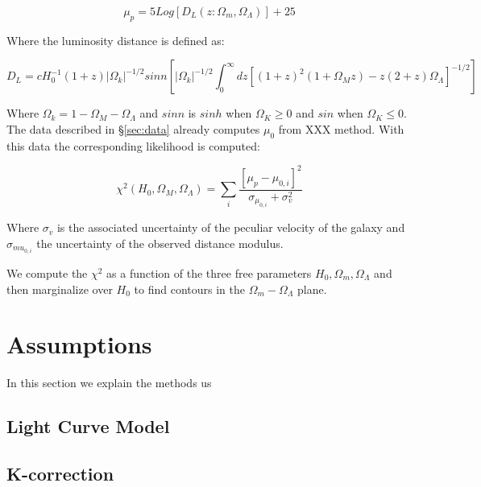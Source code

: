 \documentclass[11pt]{article}
\begin{document}

\begin{equation}\label{eq:dmodulus}
\mu_p =  5Log[D_L(z:\Omega_m, \Omega_{\Lambda})] + 25
\end{equation}

Where the luminosity distance is defined as:

\begin{equation}
D_L = cH_{0}^{-1} (1+z)|\Omega_k|^{-1/2} sin n\left[ |\Omega_k|^{-1/2}
\int_0^{\infty} dz[(1+z)^2(1+\Omega_Mz) - z(2+z)\Omega_{\Lambda}]^{-1/2}\right]
\end{equation}

Where $\Omega_k = 1 - \Omega_M - \Omega_{\Lambda}$ and $sin n$ is
$sinh$ when $\Omega_K \geq 0$ and $sin$ when $\Omega_K \leq 0$. The
data described in \S \ref{sec:data} already computes $\mu_0$ from XXX
method. With this data the corresponding likelihood is computed:

\begin{equation}
\chi^2(H_0, \Omega_M, \Omega_{\Lambda}) = \sum_i
\dfrac{[\mu_p - \mu_{0,i}]^2}{\sigma_{\mu_{0,i}} + \sigma_v^2}
\end{equation}

Where $\sigma_v$ is the associated uncertainty of the peculiar velocity
of the galaxy and $\sigma_{mu_{0,i}}$ the uncertainty of the observed
distance modulus.

We compute the $\chi^2$ as a function of the three free parameters
$H_0, \Omega_m, \Omega_{\Lambda}$ and then marginalize over $H_0$
to find contours in the $\Omega_m - \Omega_{\Lambda}$ plane.

\section{Assumptions}\label{sec:assumptions}

In this section we explain the methods us

\subsection{Light Curve Model}

\subsection{K-correction}
\end{document}
